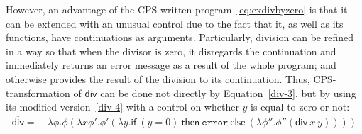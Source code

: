 However, an advantage of the CPS-written program~\eqref{eq:exdivbyzero} is that it can be extended with an unusual control due to the fact that it, as well as its functions, have continuations as arguments. Particularly, division can be refined in a way so that when the divisor is zero, it disregards the continuation and immediately returns an error message as a result of the whole program; and otherwise provides the result of the division to its continuation. 
Thus, CPS-transformation of $\mathsf{div}$ can be done not directly by Equation~\eqref{div-3}, but by using its modified version~\eqref{div-4} with a control on whether $y$ is equal to zero or not:
%
\begin{align}
\overline{\mathsf{div}} = \ & \lambda \phi . \phi ( \lambda x \phi'. \phi' ( \lambda y .  \mathsf{if} \ (y =0)  \ \mathsf{then} \ \mathtt{error}  \ \mathsf{else}  \  (\lambda \phi''. \phi'' (\mathsf{div} \ x \ y) )) ) \label{div-4}
\end{align} 

